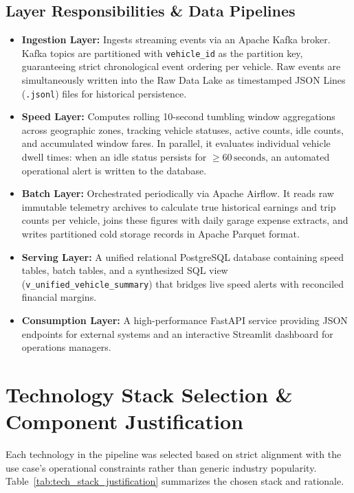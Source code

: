 \documentclass[11pt,a4paper]{article}
\begin{document}
\subsection{Layer Responsibilities \& Data Pipelines}
\begin{itemize}
    \item \textbf{Ingestion Layer:} Ingests streaming events via an Apache Kafka broker. Kafka topics are partitioned with \texttt{vehicle\_id} as the partition key, guaranteeing strict chronological event ordering per vehicle. Raw events are simultaneously written into the Raw Data Lake as timestamped JSON Lines (\texttt{.jsonl}) files for historical persistence.
    \item \textbf{Speed Layer:} Computes rolling 10-second tumbling window aggregations across geographic zones, tracking vehicle statuses, active counts, idle counts, and accumulated window fares. In parallel, it evaluates individual vehicle dwell times: when an idle status persists for $\ge 60\,\text{seconds}$, an automated operational alert is written to the database.
    \item \textbf{Batch Layer:} Orchestrated periodically via Apache Airflow. It reads raw immutable telemetry archives to calculate true historical earnings and trip counts per vehicle, joins these figures with daily garage expense extracts, and writes partitioned cold storage records in Apache Parquet format.
    \item \textbf{Serving Layer:} A unified relational PostgreSQL database containing speed tables, batch tables, and a synthesized SQL view (\texttt{v\_unified\_vehicle\_summary}) that bridges live speed alerts with reconciled financial margins.
    \item \textbf{Consumption Layer:} A high-performance FastAPI service providing JSON endpoints for external systems and an interactive Streamlit dashboard for operations managers.
\end{itemize}

\section{Technology Stack Selection \& Component Justification}
Each technology in the pipeline was selected based on strict alignment with the use case's operational constraints rather than generic industry popularity. Table~\ref{tab:tech_stack_justification} summarizes the chosen stack and rationale.
\end{document}
